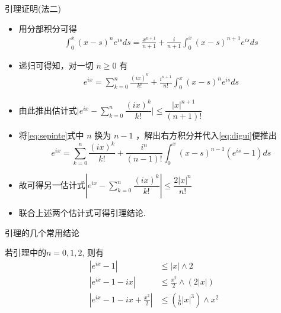 \documentclass[Prob-All.tex]{subfiles}
\begin{document}
\begin{frame}{引理证明(法二)}
\begin{itemize}
	\item 用分部积分可得
	\begin{align}\label{eq:sepinte}
		\int_{0}^{x}(x-s)^{n} e^{i s} d s=\frac{x^{n+1}}{n+1}+\frac{i}{n+1} \int_{0}^{x}(x-s)^{n+1} e^{i s} d s
	\end{align}

	\item 递归可得知，对一切 $n \geq 0$ 有
	\begin{align}\label{eq:digui}
		e^{i x}=\sum_{k=0}^{n} \frac{(i x)^{k}}{k!}+\frac{i^{n+1}}{n!} \int_{0}^{x}(x-s)^{n} e^{i s} d s
	\end{align}

	\item
	由此推出估计式$
	\big|e^{i x}-\sum_{k=0}^{n} \dfrac{(i x)^{k}}{k!}\big| \leq \dfrac{|x|^{n+1}}{(n+1)!}$
	\item 将\eqref{eq:sepinte}式中 $n$ 换为 $n-1$ ，解出右方积分并代入\eqref{eq:digui}便推出
	\[
	e^{i x}=\sum_{k=0}^{n} \frac{(i x)^{k}}{k!}+\frac{i^{n}}{(n-1)!} \int_{0}^{x}(x-s)^{n-1}\left(e^{i s}-1\right) d s
	\]
\item 故可得另一估计式$
	\left|e^{i x}-\sum_{k=0}^{n} \dfrac{(i x)^{k}}{k!}\right| \leq \dfrac{2|x|^{n}}{n!}$
\item 联合上述两个估计式可得引理结论.%


\end{itemize}

\end{frame}
\begin{frame}{引理的几个常用结论}
\begin{rmk} 若引理中的$n=0,1,2$, 则有%
	\begin{align*}
		\left|e^{i x}-1\right| & \leq|x| \wedge 2 \\
		\left|e^{i x}-1-i x\right| & \leq \frac{x^{2}}{2} \wedge(2|x|) \\
		\left|e^{i x}-1-i x+\frac{x^{2}}{2}\right| & \leq\left(\frac{1}{6}|x|^{3}\right) \wedge x^{2}
	\end{align*}
\end{rmk}

\end{frame}
\end{document}
